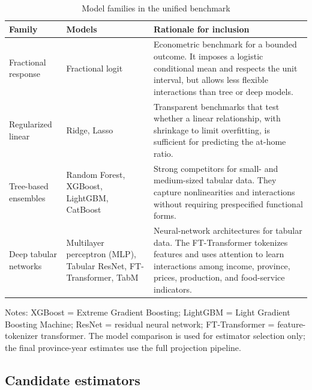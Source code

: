 \documentclass[preprint,12pt,authoryear]{elsarticle}
\begin{document}
\begin{table}[htbp]
\centering
\small
\caption{Model families in the unified benchmark}
\label{tab:model_families}
\begin{threeparttable}
\begin{tabularx}{\textwidth}{p{2.6cm} p{3.5cm} X}
\toprule
Family & Models & Rationale for inclusion \\
\midrule
Fractional response & Fractional logit & Econometric benchmark for a bounded outcome. It imposes a logistic conditional mean and respects the unit interval, but allows less flexible interactions than tree or deep models. \\ \addlinespace
Regularized linear & Ridge, Lasso & Transparent benchmarks that test whether a linear relationship, with shrinkage to limit overfitting, is sufficient for predicting the at-home ratio. \\ \addlinespace
Tree-based ensembles & Random Forest, XGBoost, LightGBM, CatBoost & Strong competitors for small- and medium-sized tabular data. They capture nonlinearities and interactions without requiring prespecified functional forms. \\ \addlinespace
Deep tabular networks & Multilayer perceptron (MLP), Tabular ResNet, FT-Transformer, TabM & Neural-network architectures for tabular data. The FT-Transformer tokenizes features and uses attention to learn interactions among income, province, prices, production, and food-service indicators. \\
\bottomrule
\end{tabularx}
\begin{tablenotes}[flushleft]
\scriptsize
\item Notes: XGBoost = Extreme Gradient Boosting; LightGBM = Light Gradient Boosting Machine; ResNet = residual neural network; FT-Transformer = feature-tokenizer transformer. The model comparison is used for estimator selection only; the final province-year estimates use the full projection pipeline.
\end{tablenotes}
\end{threeparttable}
\end{table}

\subsection{Candidate estimators}
\end{document}
